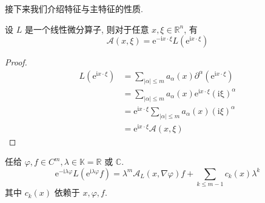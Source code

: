 \documentclass[11pt]{ctexart}[UTF8]
\begin{document}
接下来我们介绍特征与主特征的性质.
\begin{property}\leavevmode
    设 $L$ 是一个线性微分算子, 则对于任意 $x, \xi \in \mathbb{R}^n$, 有
\begin{equation*}
    \mathscr{A}(x,\xi) = \mathrm{e}^{-\mathrm{i} x \cdot \xi} L \left(\mathrm{e}^{\mathrm{i} x \cdot \xi}\right)
\end{equation*}
\end{property}
\begin{proof}
    \begin{equation*}
        \begin{aligned}
            L(\mathrm{e}^{\mathrm{i} x \cdot \xi}) & = \sum\limits_{|\alpha| \leq m} a_{\alpha}(x) \partial^{\alpha} (\mathrm{e}^{\mathrm{i} x \cdot \xi}) \\
            & = \sum\limits_{|\alpha| \leq m} a_{\alpha}(x) \mathrm{e}^{\mathrm{i} x \cdot \xi} (\mathrm{i\xi})^{\alpha} \\
            & = \mathrm{e}^{\mathrm{i} x \cdot \xi} \sum\limits_{|\alpha| \leq m} a_{\alpha}(x) (\mathrm{i}\xi)^{\alpha} \\
            & = \mathrm{e}^{\mathrm{i} x \cdot \xi} \mathscr{A}(x,\xi)
        \end{aligned}
    \end{equation*}
\end{proof}
\begin{property}\leavevmode
    任给 $\varphi,f \in C^{m}, \lambda  \in \mathbb{K} = \mathbb{R}$ 或 $\mathbb{C}$.
\begin{equation*}
    \mathrm{e}^{-\mathrm{i} \lambda \varphi} L \left( \mathrm{e}^{\mathrm{i} \lambda \varphi} f \right) = \lambda^m \mathscr{A}_L(x, \nabla \varphi) f + \sum\limits_{k \leq m-1}c_{k}(x)\lambda^k
\end{equation*}
其中 $c_{k}(x)$ 依赖于 $x, \varphi, f$.
\end{property}
\end{document}
